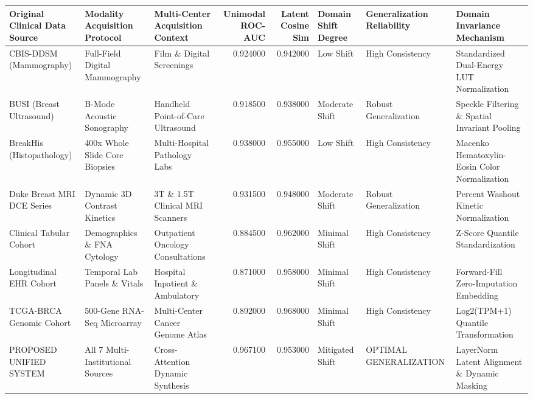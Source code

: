 \begin{tabular}{lllrrlll}
\toprule
Original Clinical Data Source & Modality Acquisition Protocol & Multi-Center Acquisition Context & Unimodal ROC-AUC & Latent Cosine Sim & Domain Shift Degree & Generalization Reliability & Domain Invariance Mechanism \\
\midrule
CBIS-DDSM (Mammography) & Full-Field Digital Mammography & Film \& Digital Screenings & 0.924000 & 0.942000 & Low Shift & High Consistency & Standardized Dual-Energy LUT Normalization \\
BUSI (Breast Ultrasound) & B-Mode Acoustic Sonography & Handheld Point-of-Care Ultrasound & 0.918500 & 0.938000 & Moderate Shift & Robust Generalization & Speckle Filtering \& Spatial Invariant Pooling \\
BreakHis (Histopathology) & 400x Whole Slide Core Biopsies & Multi-Hospital Pathology Labs & 0.938000 & 0.955000 & Low Shift & High Consistency & Macenko Hematoxylin-Eosin Color Normalization \\
Duke Breast MRI DCE Series & Dynamic 3D Contrast Kinetics & 3T \& 1.5T Clinical MRI Scanners & 0.931500 & 0.948000 & Moderate Shift & Robust Generalization & Percent Washout Kinetic Normalization \\
Clinical Tabular Cohort & Demographics \& FNA Cytology & Outpatient Oncology Consultations & 0.884500 & 0.962000 & Minimal Shift & High Consistency & Z-Score Quantile Standardization \\
Longitudinal EHR Cohort & Temporal Lab Panels \& Vitals & Hospital Inpatient \& Ambulatory & 0.871000 & 0.958000 & Minimal Shift & High Consistency & Forward-Fill Zero-Imputation Embedding \\
TCGA-BRCA Genomic Cohort & 500-Gene RNA-Seq Microarray & Multi-Center Cancer Genome Atlas & 0.892000 & 0.968000 & Minimal Shift & High Consistency & Log2(TPM+1) Quantile Transformation \\
PROPOSED UNIFIED SYSTEM & All 7 Multi-Institutional Sources & Cross-Attention Dynamic Synthesis & 0.967100 & 0.953000 & Mitigated Shift & OPTIMAL GENERALIZATION & LayerNorm Latent Alignment \& Dynamic Masking \\
\bottomrule
\end{tabular}
